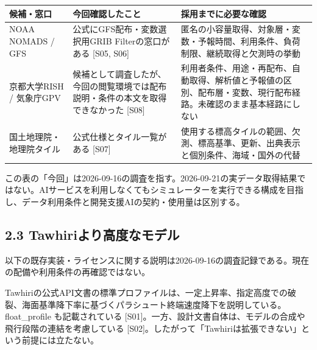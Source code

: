 \documentclass[11pt,a4paper]{article}
\newcounter{none}
\begin{document}
{\def\LTcaptype{none} %
\begin{longtable}[]{@{}
  >{\raggedright\arraybackslash}p{}
  >{\raggedright\arraybackslash}p{}
  >{\raggedright\arraybackslash}p{}@{}}
\toprule\noalign{}
\begin{minipage}[b]{\linewidth}\raggedright
候補・窓口
\end{minipage} & \begin{minipage}[b]{\linewidth}\raggedright
今回確認したこと
\end{minipage} & \begin{minipage}[b]{\linewidth}\raggedright
採用までに必要な確認
\end{minipage} \\
\midrule\noalign{}
\endhead
\bottomrule\noalign{}
\endlastfoot
NOAA NOMADS / GFS & 公式にGFS配布・変数選択用GRIB Filterの窓口がある
{[}S05, S06{]} &
匿名の小容量取得、対象層・変数・予報時間、利用条件、負荷制限、継続取得と欠測時の挙動 \\
京都大学RISH / 気象庁GPV &
候補として調査したが、今回の閲覧環境では配布説明・条件の本文を取得できなかった
{[}S08{]} &
利用者条件、用途・再配布、自動取得、解析値と予報値の区別、配布層・変数、現行配布経路。未確認のまま基本経路にしない \\
国土地理院・地理院タイル & 公式仕様とタイル一覧がある {[}S07{]} &
使用する標高タイルの範囲、欠測、標高基準、更新、出典表示と個別条件、海域・国外の代替 \\
\end{longtable}
}

この表の「今回」は2026-09-16の調査を指す。2026-09-21の実データ取得結果ではない。AIサービスを利用しなくてもシミュレーターを実行できる構成を目指し、データ利用条件と開発支援AIの契約・使用量は区別する。

\subsection{2.3
Tawhiriより高度なモデル}\label{tawhiriux3088ux308aux9ad8ux5ea6ux306aux30e2ux30c7ux30eb}

以下の既存実装・ライセンスに関する説明は2026-09-16の調査記録である。現在の配備や利用条件の再確認ではない。

Tawhiriの公式API文書の標準プロファイルは、一定上昇率、指定高度での破裂、海面基準降下率に基づくパラシュート終端速度降下を説明している。float\_profile
も記載されている
{[}S01{]}。一方、設計文書自体は、モデルの合成や飛行段階の連結を考慮している
{[}S02{]}。したがって「Tawhiriは拡張できない」という前提には立たない。
\end{document}

